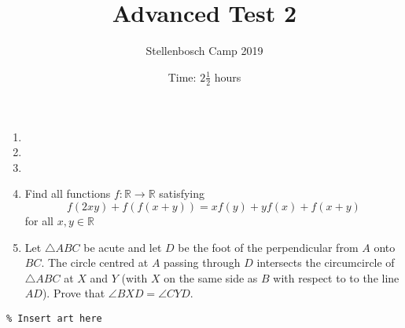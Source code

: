 \documentclass{article}
\title{Advanced Test 2}
\author{Stellenbosch Camp 2019}
\date{Time: $2\frac{1}{2}$ hours}
\begin{document}
\maketitle
\thispagestyle{empty}


\begin{enumerate}[1.]

\item 

\item 

\item 

\item Find all functions $f: \mathbb{R} \rightarrow \mathbb{R}$ satisfying $$f(2xy) +f(f(x+y)) = xf(y) + yf(x) +f(x+y) $$ for all $x,y \in \mathbb{R}$

\item Let $\triangle ABC$ be acute and let $D$ be the foot of the perpendicular from $A$ onto $BC$. The circle centred at $A$ passing through $D$ intersects the circumcircle of $\triangle ABC$ at $X$ and $Y$ (with $X$ on the same side as $B$ with respect to to the line $AD$). Prove that $\angle BXD = \angle CYD$.

\end{enumerate}

\vfill
\begin{center} \begin{verbatim}
% Insert art here
\end{verbatim} \end{center}
\end{document}

